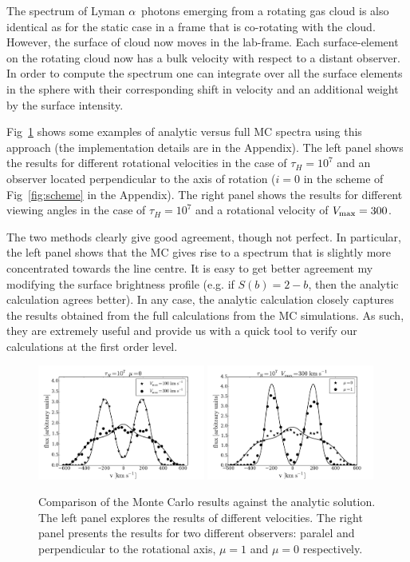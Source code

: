 \documentclass{emulateapj}
\newcommand{\lya}{{Lyman $\alpha$~}}
\newcommand{\kms}{{\ifmmode{{\mathrm{\,km\ s}^{-1}}}\else{\,km~s$^{-1}$}\fi}}
\begin{document}
The spectrum of \lya photons emerging from a rotating gas cloud is
also identical as for the static case in a frame that is co-rotating
with the cloud. 
However, the surface of cloud now moves in the lab-frame. 
Each surface-element on the rotating cloud now has a bulk
velocity with respect to a distant observer. 
In order to compute the
spectrum one can integrate over all the surface elements in the
sphere with their corresponding shift in velocity and an additional
weight by the surface intensity.

Fig~\ref{fig:comparison} shows some examples of analytic versus full MC
spectra using this approach (the implementation details are in the Appendix).
The left panel shows the results for different rotational velocities
in the case of $\tau_{H}=10^7$ and an observer located perpendicular
to the axis of rotation ($i=0$ in the scheme of Fig~\ref{fig:scheme}
in the Appendix). 
The right panel shows the results for different viewing angles in the
case of $\tau_{H}=10^7$ and a rotational velocity of $V_{\rm
  max}=300$\kms. 

The two methods clearly give good agreement, though not perfect. 
In particular, the left panel shows that the MC gives rise to a spectrum that is
slightly more concentrated towards the line centre. 
It is easy to get better agreement my modifying the surface brightness
profile (e.g. if $S(b)=2-b$, then the analytic calculation agrees
better).
In any case, the analytic calculation closely captures the results
obtained from the full calculations from the MC simulations.  
As such, they are extremely useful and provide us with a quick tool to
verify our calculations at the first order level. 


\begin{figure}
\begin{center}
  \includegraphics[width=0.49\textwidth]{fig10a.pdf}
  \includegraphics[width=0.49\textwidth]{fig10b.pdf}
\end{center}
\caption{
Comparison of the Monte Carlo results against the analytic
solution. The left panel explores the results of different velocities.
The right panel presents the results for two different observers:
paralel and perpendicular to the rotational axis, $\mu=1$ and $\mu=0$
respectively.
\label{fig:comparison} }   
\end{figure}
\end{document}
